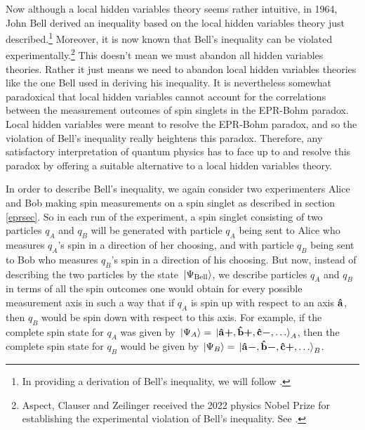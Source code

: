 Now although a local hidden variables theory seems rather intuitive, in 1964, John Bell derived an inequality based on the local hidden variables theory just described.\footnote{In providing a derivation of Bell's inequality, we will follow \cite[241-249]{Sakurai}.} Moreover, it is now known that Bell's inequality can be violated experimentally.\footnote{Aspect, Clauser and Zeilinger received the 2022 physics Nobel Prize for establishing the experimental violation of Bell's inequality. See \cite{Nobel2022}.} This doesn't mean we must abandon all hidden variables theories. Rather it just means we need to abandon local hidden variables theories like the one Bell used in deriving his inequality.  It is nevertheless somewhat paradoxical that local hidden variables cannot account for the correlations between the measurement outcomes of spin singlets in the EPR-Bohm paradox. Local hidden variables were meant to resolve the EPR-Bohm paradox, and so the violation of Bell's inequality really heightens this paradox. Therefore, any satisfactory interpretation of quantum physics has to face up to and resolve this paradox by offering a suitable alternative to a local hidden variables theory. 

In order to describe Bell's inequality, we again consider two experimenters Alice and Bob making spin measurements on a spin singlet as described in section \ref{eprsec}. So in each run of the experiment, a spin singlet consisting of two particles $q_A$ and $q_B$ will be generated with particle $q_A$ being sent to Alice who measures $q_A$'s spin in a direction of her choosing, and with particle $q_B$ being sent to Bob who measures $q_B$'s spin in a direction of his choosing.  But now, instead of describing the two particles by the state $\ket*{\Psi_{\text{Bell}}}$, we describe particles $q_A$ and $q_B$ in terms of all the spin outcomes one would obtain for every possible measurement axis in such a way that if $q_A$ is spin up with respect to an axis $\vb{\hat{{a}}}$, then $q_B$ would be spin down with respect to this axis. For example, if the complete spin state for $q_A$ was given by $\ket*{\Psi_A}=\ket*{\vb{\hat{{a}}}\bm{+},\vb{\hat{{b}}}\bm{+},\vb{\hat{{c}}}\bm{-},\ldots}_A$, then the complete spin state for $q_B$ would be given by $\ket*{\Psi_B}=\ket*{\vb{\hat{{a}}}\bm{-},\vb{\hat{{b}}}\bm{-},\vb{\hat{{c}}}\bm{+},\ldots}_B$.

